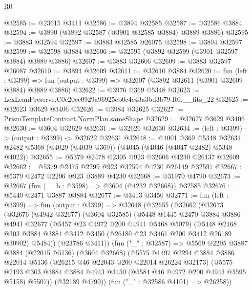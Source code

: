 \begin{lexlean}{R0}
\begin{coremodule}
@32585 := @23615 @3411
@32586 := @3894 @32585
@32587 := @32586 @3884
@32594 := @3890 (@3892 @32587 (@3901 @32585 @3884) @3889 @3886)
@32595 := @3883 @32594
@32597 := @3883 @32585 @26075
@32598 := @3894 @32597
@32599 := @32598 @3884
@32606 := @32595 (@3892 @32599 (@3901 @32597 @3884) @3889 @3886)
@32607 := @3883 @32606
@32609 := @3883 @32597 @26087
@32610 := @3894 @32609
@32611 := @32610 @3884
@32620 := fun (left : @3399) =>
  fun (output : @3399) => @32607 (@3892 @32611 (@3901 @32609 @3884) @3889 @3886)
@32622 := @3976 @369 @5348
@32623 := LexLeanPreserve.C0e20cc0929a96925eb0c4c43a3bd3b79.R0.__fits_22
@32625 := @32623 @3629 @3406
@32626 := @3984 @32625
@32627 := PrismTemplateContract.NormPlan.sameShape
@32629 := @32627 @3629 @3406
@32630 := @3604 @32629
@32631 := @32626 @32630
@32634 := (left : @3399) -> (output : @3399) -> @32622 @32631
@32648 := @4001
    @369
    @5348
    @32631
    @2482
    @5368
    (@4029 (@4039 @369))
    (@4045 (@4046 (@4047 @2482) @5348 @4022))
@32655 := @5379 @2478 @2305 @923 @32606 @4230 @26137 @32609
@32662 := @5379 @2475 @2299 @923 @32594 @4230 @26149 @32597
@32667 := @5379 @2472 @2296 @923 @3889 @4230
@32668 := @31970 @4790
@32673 := @32667 (fun (__b : @3598) => @3604 (@4232 @32668)) @32585
@32676 := @5440 @2471 @3887 @3884
@32677 := @3413 @3450
@32771 := fun (left : @3399) =>
  fun (output : @3399) =>
  @32648
    (@32655
      (@32662
        (@32673
          (@32676
            (@4942 @32677)
            (@3604 @32585)
            (@5448
              @1445
              @2470
              @3884
              @3886
              @4941
              @32677
              (@5457 @23 @4972 @200 @4941 @5468 @5079)
              (@5448
                @2468
                @303
                @3884
                @3884
                @3412
                @3450
                (@26180 @23 @3461 @200 @3412 @26189 @30902)
                @5484))
            (@23786 @3411))
          (fun ("_" : @32587) =>
          @5569
            @2295
            @3887
            @3884
            (@22015 @5136)
            (@3604 @32668)
            (@5575
              @1497
              @2294
              @3884
              @3886
              @22014
              @5136
              (@26215 @46 @22043 @200 @22014 @26224 @32173)
              (@5575
                @2193
                @303
                @3884
                @3884
                @4943
                @3450
                (@5584 @46 @4972 @200 @4943 @5595 @5158)
                @5507))
            (@32189 @4790))
          (fun ("_" : @32586 @4101) => @26258))

\end{coremodule}
\end{lexlean}
